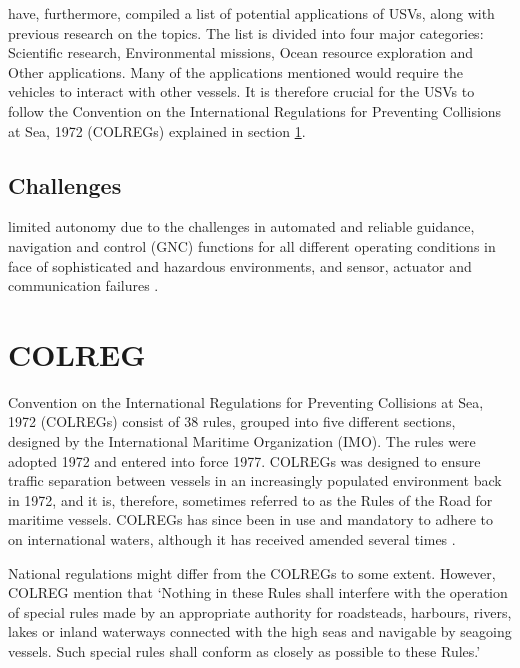 \textcite{liu2016unmanned} have, furthermore, compiled a list of potential applications of USVs, along with previous research on the topics.
The list is divided into four major categories: Scientific research, Environmental missions, Ocean resource exploration and Other applications.
Many of the applications mentioned would require the vehicles to interact with other vessels.
It is therefore crucial for the USVs to follow the Convention on the International Regulations for Preventing Collisions at Sea, 1972 (COLREGs) explained in section \ref{sec_colreg}.



\subsection{Challenges}
limited autonomy due to the challenges in automated and reliable guidance, navigation and control (GNC) functions for all different operating conditions in face of sophisticated and hazardous environments, and sensor, actuator and communication failures \cite{liu2016unmanned}.
\section{COLREG}
\label{sec_colreg}
Convention on the International Regulations for Preventing Collisions at Sea, 1972 (COLREGs) consist of 38 rules, grouped into five different sections, designed by the International Maritime Organization (IMO).
The rules were adopted 1972 and entered into force 1977.
COLREGs was designed to ensure traffic separation between vessels in an increasingly populated environment back in 1972, and it is, therefore, sometimes referred to as the Rules of the Road for maritime vessels.
COLREGs has since been in use and mandatory to adhere to on international waters, although it has received amended several times \cite{colreg_about_imo}.

National regulations might differ from the COLREGs to some extent. However, COLREG mention that ‘Nothing in these Rules shall interfere with the operation of special rules made by an appropriate authority for
roadsteads, harbours, rivers, lakes or inland waterways connected with the high seas and navigable by seagoing
vessels.
Such special rules shall conform as closely as possible to these Rules.’ \cite{colreg}


